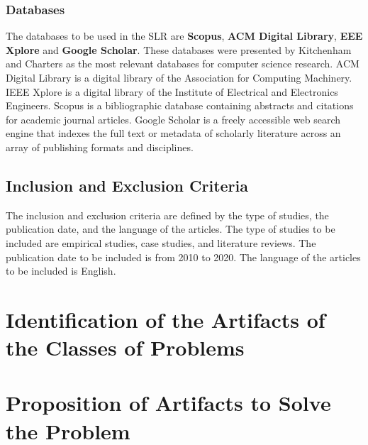 \subsubsection{Databases}
The databases to be used in the SLR are \textbf{Scopus}, \textbf{ACM Digital Library}, \textbf{EEE Xplore} and \textbf{Google Scholar}. These databases were presented by Kitchenham and Charters as the most relevant databases for computer science research.
ACM Digital Library is a digital library of the Association for Computing Machinery. IEEE Xplore is a digital library of the Institute of Electrical and Electronics Engineers. Scopus is a bibliographic database containing abstracts and citations for academic journal articles. Google Scholar is a freely accessible web search engine that indexes the full text or metadata of scholarly literature across an array of publishing formats and disciplines.

\subsection{Inclusion and Exclusion Criteria}
The inclusion and exclusion criteria are defined by the type of studies, the publication date, and the language of the articles. 
The type of studies to be included are empirical studies, case studies, and literature reviews. The publication date to be included is from 2010 to 2020. The language of the articles to be included is English.

\section{Identification of the Artifacts of the Classes of Problems}


\section{Proposition of Artifacts to Solve the Problem}

